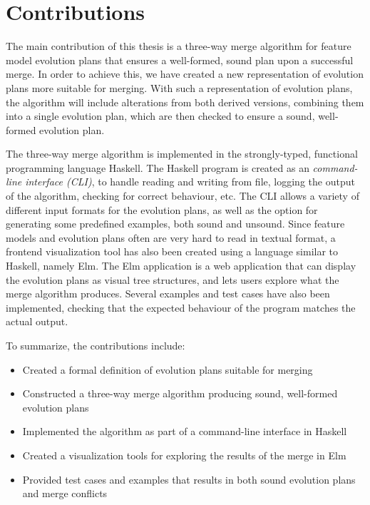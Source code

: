 \documentclass[a4paper,english]{ifimaster}
\begin{document}
\section{Contributions}%
\label{sec:contributions}

The main contribution of this thesis is a three-way merge algorithm for feature model evolution plans that ensures a well-formed, sound plan upon a successful merge. In order to achieve this, we have created a new representation of evolution plans more suitable for merging. With such a representation of evolution plans, the algorithm will include alterations from both derived versions, combining them into a single evolution plan, which are then checked to ensure a sound, well-formed evolution plan.

The three-way merge algorithm is implemented in the strongly-typed, functional programming language Haskell. The Haskell program is created as an \textit{command-line interface (CLI)}, to handle reading and writing from file, logging the output of the algorithm, checking for correct behaviour, etc. The CLI allows a variety of different input formats for the evolution plans, as well as the option for generating some predefined examples, both sound and unsound. Since feature models and evolution plans often are very hard to read in textual format, a frontend visualization tool has also been created using a language similar to Haskell, namely Elm. The Elm application is a web application that can display the evolution plans as visual tree structures, and lets users explore what the merge algorithm produces. Several examples and test cases have also been implemented, checking that the expected behaviour of the program matches the actual output.

To summarize, the contributions include:

\begin{itemize}
  \item Created a formal definition of evolution plans suitable for merging
  \item Constructed a three-way merge algorithm producing sound, well-formed evolution plans
  \item Implemented the algorithm as part of a command-line interface in Haskell
  \item Created a visualization tools for exploring the results of the merge in Elm
  \item Provided test cases and examples that results in both sound evolution plans and merge conflicts
\end{itemize}
\end{document}
